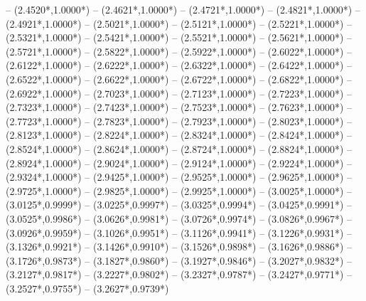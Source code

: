 {	-- ({2.4520*\dx},{1.0000*\dy})
	-- ({2.4621*\dx},{1.0000*\dy})
	-- ({2.4721*\dx},{1.0000*\dy})
	-- ({2.4821*\dx},{1.0000*\dy})
	-- ({2.4921*\dx},{1.0000*\dy})
	-- ({2.5021*\dx},{1.0000*\dy})
	-- ({2.5121*\dx},{1.0000*\dy})
	-- ({2.5221*\dx},{1.0000*\dy})
	-- ({2.5321*\dx},{1.0000*\dy})
	-- ({2.5421*\dx},{1.0000*\dy})
	-- ({2.5521*\dx},{1.0000*\dy})
	-- ({2.5621*\dx},{1.0000*\dy})
	-- ({2.5721*\dx},{1.0000*\dy})
	-- ({2.5822*\dx},{1.0000*\dy})
	-- ({2.5922*\dx},{1.0000*\dy})
	-- ({2.6022*\dx},{1.0000*\dy})
	-- ({2.6122*\dx},{1.0000*\dy})
	-- ({2.6222*\dx},{1.0000*\dy})
	-- ({2.6322*\dx},{1.0000*\dy})
	-- ({2.6422*\dx},{1.0000*\dy})
	-- ({2.6522*\dx},{1.0000*\dy})
	-- ({2.6622*\dx},{1.0000*\dy})
	-- ({2.6722*\dx},{1.0000*\dy})
	-- ({2.6822*\dx},{1.0000*\dy})
	-- ({2.6922*\dx},{1.0000*\dy})
	-- ({2.7023*\dx},{1.0000*\dy})
	-- ({2.7123*\dx},{1.0000*\dy})
	-- ({2.7223*\dx},{1.0000*\dy})
	-- ({2.7323*\dx},{1.0000*\dy})
	-- ({2.7423*\dx},{1.0000*\dy})
	-- ({2.7523*\dx},{1.0000*\dy})
	-- ({2.7623*\dx},{1.0000*\dy})
	-- ({2.7723*\dx},{1.0000*\dy})
	-- ({2.7823*\dx},{1.0000*\dy})
	-- ({2.7923*\dx},{1.0000*\dy})
	-- ({2.8023*\dx},{1.0000*\dy})
	-- ({2.8123*\dx},{1.0000*\dy})
	-- ({2.8224*\dx},{1.0000*\dy})
	-- ({2.8324*\dx},{1.0000*\dy})
	-- ({2.8424*\dx},{1.0000*\dy})
	-- ({2.8524*\dx},{1.0000*\dy})
	-- ({2.8624*\dx},{1.0000*\dy})
	-- ({2.8724*\dx},{1.0000*\dy})
	-- ({2.8824*\dx},{1.0000*\dy})
	-- ({2.8924*\dx},{1.0000*\dy})
	-- ({2.9024*\dx},{1.0000*\dy})
	-- ({2.9124*\dx},{1.0000*\dy})
	-- ({2.9224*\dx},{1.0000*\dy})
	-- ({2.9324*\dx},{1.0000*\dy})
	-- ({2.9425*\dx},{1.0000*\dy})
	-- ({2.9525*\dx},{1.0000*\dy})
	-- ({2.9625*\dx},{1.0000*\dy})
	-- ({2.9725*\dx},{1.0000*\dy})
	-- ({2.9825*\dx},{1.0000*\dy})
	-- ({2.9925*\dx},{1.0000*\dy})
	-- ({3.0025*\dx},{1.0000*\dy})
	-- ({3.0125*\dx},{0.9999*\dy})
	-- ({3.0225*\dx},{0.9997*\dy})
	-- ({3.0325*\dx},{0.9994*\dy})
	-- ({3.0425*\dx},{0.9991*\dy})
	-- ({3.0525*\dx},{0.9986*\dy})
	-- ({3.0626*\dx},{0.9981*\dy})
	-- ({3.0726*\dx},{0.9974*\dy})
	-- ({3.0826*\dx},{0.9967*\dy})
	-- ({3.0926*\dx},{0.9959*\dy})
	-- ({3.1026*\dx},{0.9951*\dy})
	-- ({3.1126*\dx},{0.9941*\dy})
	-- ({3.1226*\dx},{0.9931*\dy})
	-- ({3.1326*\dx},{0.9921*\dy})
	-- ({3.1426*\dx},{0.9910*\dy})
	-- ({3.1526*\dx},{0.9898*\dy})
	-- ({3.1626*\dx},{0.9886*\dy})
	-- ({3.1726*\dx},{0.9873*\dy})
	-- ({3.1827*\dx},{0.9860*\dy})
	-- ({3.1927*\dx},{0.9846*\dy})
	-- ({3.2027*\dx},{0.9832*\dy})
	-- ({3.2127*\dx},{0.9817*\dy})
	-- ({3.2227*\dx},{0.9802*\dy})
	-- ({3.2327*\dx},{0.9787*\dy})
	-- ({3.2427*\dx},{0.9771*\dy})
	-- ({3.2527*\dx},{0.9755*\dy})
	-- ({3.2627*\dx},{0.9739*\dy})
}

